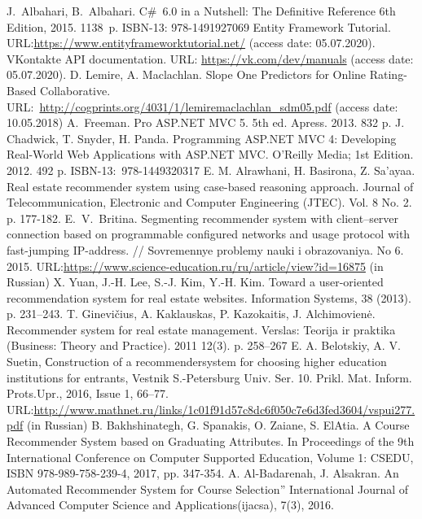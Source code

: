 \documentclass[conference,a4]{IEEEtran}
\begin{document}
\begin{thebibliography}{99}
 J.~Albahari, B.~Albahari. C\#~6.0 in a Nutshell: The Definitive Reference 6th Edition, 2015. 1138~p. ISBN-13: 978-1491927069
Entity Framework Tutorial. URL:\url{https://www.entityframeworktutorial.net/} (access date: 05.07.2020).
VKontakte API documentation. URL: \url{https://vk.com/dev/manuals} (access date: 05.07.2020).
 D. Lemire, A. Maclachlan. Slope One Predictors for Online Rating-Based Collaborative. URL:~\url{http://cogprints.org/4031/1/lemiremaclachlan_sdm05.pdf} (access date: 10.05.2018)
A.~Freeman. Pro ASP.NET MVC 5. 5th ed. Apress. 2013. 832 p. 
 J. Chadwick, T. Snyder, H. Panda. Programming ASP.NET MVC 4: Developing Real-World Web Applications with ASP.NET MVC.  O'Reilly Media; 1st Edition. 2012. 492 p.  ISBN-13:~978-1449320317
E. M. Alrawhani, H. Basirona, Z. Sa’ayaa. Real estate recommender system using case-based reasoning approach. Journal of
Telecommunication, Electronic and Computer Engineering (JTEC).
Vol. 8 No. 2. p. 177-182.
 E.~V.~Britina. Segmenting recommender system with client--server connection based on programmable configured networks and usage protocol with fast-jumping IP-address.  // Sovremennye problemy nauki i obrazovaniya. No 6. 2015.
URL:\url{https://www.science-education.ru/ru/article/view?id=16875} (in Russian)
 X. Yuan, J.-H. Lee, S.-J. Kim, Y.-H. Kim. Toward a user-oriented recommendation system for real estate websites. Information Systems, 38 (2013). p. 231–243.
T. Ginevičius, A. Kaklauskas, P. Kazokaitis, J. Alchimovienė.
Recommender system for real estate management. Verslas: Teorija ir
praktika (Business: Theory and Practice). 2011 12(3). p. 258–267 
 E. A. Belotskiy, A. V. Suetin, Сonstruction of a recommendersystem for choosing higher education institutions for entrants, Vestnik S.-Petersburg Univ. Ser. 10. Prikl. Mat. Inform. Prots.Upr., 2016, Issue 1, 66–77. URL:\url{http://www.mathnet.ru/links/1c01f91d57c8dc6f050c7e6d3fed3604/vspui277.pdf} (in Russian)
B. Bakhshinategh, G. Spanakis, O. Zaiane, S. ElAtia. A Course Recommender System based on Graduating Attributes. In Proceedings of the 9th International Conference on Computer Supported Education, Volume 1: CSEDU, ISBN 978-989-758-239-4, 2017, pp. 347-354. 
A. Al-Badarenah, J. Alsakran. An Automated Recommender System for Course Selection” International Journal of Advanced Computer Science and Applications(ijacsa), 7(3), 2016. 

\end{thebibliography}
\end{document}
